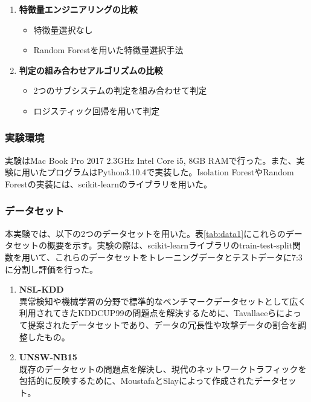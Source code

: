 \documentclass{css}
\begin{document}
\begin{enumerate}
    \item \textbf{特徴量エンジニアリングの比較}
        \begin{itemize}
            \item 特徴量選択なし
            \item Random Forestを用いた特徴量選択手法
        \end{itemize}
    \item \textbf{判定の組み合わせアルゴリズムの比較}
        \begin{itemize}
            \item 2つのサブシステムの判定を組み合わせて判定
            \item ロジスティック回帰を用いて判定
        \end{itemize}
\end{enumerate}

\subsubsection{実験環境}

実験はMac Book Pro 2017 2.3GHz Intel Core i5, 8GB RAMで行った。また、実験に用いたプログラムはPython3.10.4で実装した。Isolation ForestやRandom Forestの実装には、scikit-learnのライブラリを用いた\cite{scikit-learn}。

\subsubsection{データセット}
本実験では、以下の2つのデータセットを用いた。表\ref{tab:data1}にこれらのデータセットの概要を示す。実験の際は、scikit-learnライブラリのtrain-test-split関数を用いて、これらのデータセットをトレーニングデータとテストデータに7:3に分割し評価を行った。

\begin{enumerate}
    \item \textbf{NSL-KDD}\\
        異常検知や機械学習の分野で標準的なベンチマークデータセットとして広く利用されてきたKDDCUP99\cite{KDDCUP99}の問題点を解決するために、Tavallaeeらによって提案されたデータセットであり、データの冗長性や攻撃データの割合を調整したもの\cite{Tavallaee2009-we}。
    \item \textbf{UNSW-NB15}\\
        既存のデータセットの問題点を解決し、現代のネットワークトラフィックを包括的に反映するために、MoustafaとSlayによって作成されたデータセット\cite{Moustafa2015-cg}。
\end{enumerate}
\end{document}
